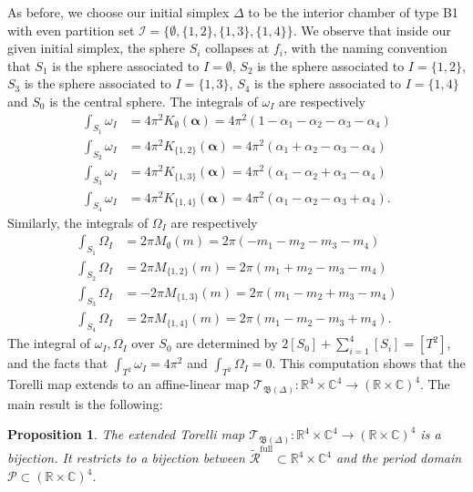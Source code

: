 \documentclass[12pt,letterpaper,reqno]{amsart}
\def\mathbf#1{#1}%
\newtheorem{prop}[thm]{Proposition}
\theoremstyle{remark}
\theoremstyle{definition}
\numberwithin{thm}{section}
\numberwithin{equation}{section}
\numberwithin{figure}{section}
\newcommand{\R}{\ensuremath{\mathbb R}}
\newcommand{\C}{\ensuremath{\mathbb C}}
\newcommand{\calP}{\mathcal P}
\newcommand{\bfm}{\mathbf{m}}
\newcommand{\Simplex}{\Delta}
\begin{document}
As before, we choose our initial simplex $\Delta$ to be the interior chamber of type B1 with even partition set $\mathcal{I}=\{\emptyset, \{1, 2\}, \{1, 3\}, \{1, 4\}\}$. We observe that
inside our given initial simplex,
the sphere $S_i$ collapses at $f_i$, with the naming convention that 
$S_1$ is the sphere associated to $I=\emptyset$, $S_2$ is the sphere associated to $I=\{1, 2\}$, $S_3$ is the sphere associated to $I=\{1, 3\}$, $S_4$ is the sphere associated to $I=\{1, 4\}$ and $S_0$ is the central sphere.
 The integrals of $\omega_I$ are respectively \begin{align*}
\int_{S_1} \omega_I &=4 \pi^2 K_{\emptyset}(\boldsymbol{\alpha})= 4 \pi^2 (1 - \alpha_1- \alpha_2-\alpha_3 - \alpha_4)\\
\int_{S_2} \omega_I&= 4 \pi^2 K_{\{1,2\}}(\boldsymbol{\alpha})=4 \pi^2 (\alpha_1+ \alpha_2 - \alpha_3-\alpha_4)\\
\int_{S_3} \omega_I &=4 \pi^2 K_{\{1, 3\}}(\boldsymbol{\alpha})=4 \pi^2 (\alpha_1- \alpha_2 + \alpha_3 -\alpha_4)\\
\int_{S_4} \omega_I&=4 \pi^2 K_{\{1, 4\}}(\boldsymbol{\alpha})=4 \pi^2 (\alpha_1- \alpha_2-\alpha_3+ \alpha_4 ).
\end{align*}
Similarly, the integrals of $\Omega_I$ are respectively
\begin{align*}
\int_{S_1} \Omega_I &=2\pi M_{\emptyset}(\bfm) = 2\pi  ( - m_1- m_2-m_3 - m_4)\\
\int_{S_2} \Omega_I&= 2\pi M_{\{1,2\}}(\bfm)= 2\pi (m_1+ m_2 - m_3-m_4)\\
\int_{S_3} \Omega_I &=-2\pi M_{\{1, 3\}}(\bfm)=2\pi (m_1- m_2+ m_3 -m_4)\\
\int_{S_4} \Omega_I&= 2\pi M_{\{1, 4\}}(\bfm)=2\pi (m_1- m_2-m_3 + m_4 ).
\end{align*}
The integral of $\omega_I, \Omega_I$ over $S_0$ are determined by $2 [S_0] + \sum_{i=1}^4 [S_i]=[T^2]$, and the facts that $\int_{T^2} \omega_I = 4 \pi^2$
and $\int_{T^2} \Omega_I = 0$.
This computation shows that the Torelli map
extends to an affine-linear map $\mathcal{T}_{\mathfrak{B}(\Simplex)} : \R^4 \times \C^4 \to (\R \times \C)^4$. The main result is the following:

\begin{prop}\label{prop:Torellisurjectivity}
The extended Torelli map $\mathcal{T}_{\mathfrak{B}(\Simplex)} : \R^4 \times \C^4 \to (\R \times \C)^4$ is a bijection. It restricts to a bijection between $\widetilde{\mathcal{R}}^{\mathrm{full}} \subset  \R^4 \times \C^4$  and the period domain $\calP \subset (\R \times \C)^4$. 
\end{prop}
\end{document}
